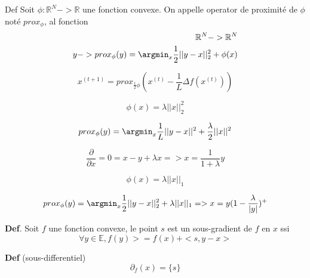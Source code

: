 Def Soit $\phi: \mathbb{R}^N->\mathbb{R}$ une fonction convexe. On appelle operator de proximit\'e de $\phi$ not\'e $prox_\phi$, al fonction 
\begin{equation}
\begin{split}
\mathbb{R}^N->\mathbb{R}^N\\
y->prox_\phi(y)=\argmin_x \frac{1}{2} ||y-x||^2_2+\phi(x)
\end{split}
\end{equation}

\begin{equation}
x^{(t+1)}=prox_{\frac{1}{2}\phi}(x^{(t)}-\frac{1}{L}\Delta f(x^{(t)}))
\end{equation}

\begin{equation}
\phi(x)=\lambda ||x||_2^2
\end{equation}

\begin{equation}
prox_\phi(y)=\argmin_x \frac{1}{L}||y-x||^2+\frac{\lambda}{2}||x||^2
\end{equation}

\begin{equation}
\frac{\partial}{\partial x}=0=x-y+\lambda x => x=\frac{1}{1+\lambda}y
\end{equation}

\begin{equation}
\phi(x)=\lambda ||x||_1
\end{equation}

\begin{equation}
prox_\phi(y) =\argmin_x\frac{1}{2} ||y-x||^2_2 +\lambda ||x||_1 => x=y(1-\frac{\lambda}{|y|})^+
\end{equation}

\textbf{Def}. Soit $f$ une fonction convexe, le point $s$ est un sous-gradient de $f$ en $x$ ssi 
\begin{equation}
\forall y\in \mathbb{E}, f(y) >= f(x)+<s,y-x>
\end{equation}

\textbf{Def} (sous-differentiel) 
\begin{equation}
\partial_f (x) = \{s\}
\end{equation}







